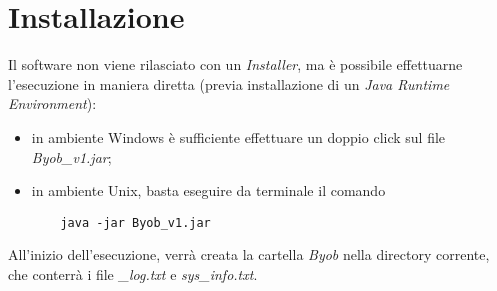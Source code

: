 \chapter{Installazione}

Il software non viene rilasciato con un \textit{Installer}, ma \`{e} possibile effettuarne l'esecuzione in maniera diretta (previa installazione di un \textit{Java Runtime Environment}):
\begin{itemize}
	\item in ambiente Windows \`{e} sufficiente effettuare un doppio click sul file \textit{Byob\_v1.jar};
	
	\item in ambiente Unix, basta eseguire da terminale il comando
	\vspace{0.5cm}
	\begin{lstlisting}
	java -jar Byob_v1.jar
	\end{lstlisting}
\end{itemize}

All'inizio dell'esecuzione, verr\`{a} creata la cartella \textit{Byob} nella directory corrente, che conterr\`{a} i file \textit{\_log.txt} e \textit{sys\_info.txt}.